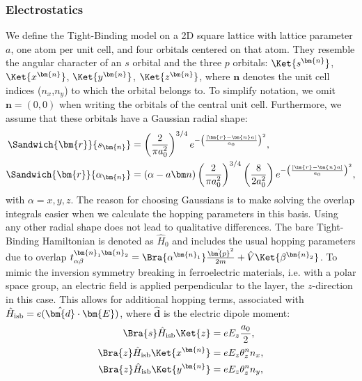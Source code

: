 \subsubsection{Electrostatics \label{sec:tb_model}}
We define the Tight-Binding model on a 2D square lattice with lattice parameter $a$, one atom per unit cell, and four orbitals centered on that atom.
They resemble the angular character of an $s$ orbital and the three $p$ orbitals: $\Ket{s^{\bm{n}}}$, $\Ket{x^{\bm{n}}}$, $\Ket{y^{\bm{n}}}$, $\Ket{z^{\bm{n}}}$, where $\bm{n}$ denotes the unit cell indices ($n_x$,$n_y$) to which the orbital belongs to.
To simplify notation, we omit $\bm{n} = (0, 0)$ when writing the orbitals of the central unit cell.
Furthermore, we assume that these orbitals have a Gaussian radial shape:
\begin{align}
	\Sandwich{\bm{r}}{s_{\bm{n}}} &= \left(\frac{2}{\pi a_0^2}\right)^{3/4}e^{-\left(\frac{|\bm{r}-\bm{n}a|}{a_0}\right)^2},\\
\Sandwich{\bm{r}}{\alpha_{\bm{n}}} &= (\alpha - a\bm n)\left(\frac{2}{\pi a_0^2}\right)^{3/4}\left(\frac{8}{2a_0^2}\right) e^{-\left(\frac{|\bm{r}-\bm{n}a|}{a_0}\right)^2},
\end{align}
with $\alpha = x, y, z$.
The reason for choosing Gaussians is to make solving the overlap integrals easier when we calculate the hopping parameters in this basis.
Using any other radial shape does not lead to qualitative differences.
The bare Tight-Binding Hamiltonian is denoted as $\hat{H}_0$ and includes the usual hopping parameters due to overlap $t_{\alpha\beta}^{\bm{n}_1\bm{n}_2} = \Bra{\alpha^{\bm{n}_1}}\frac{\hat{\bm{p}}^2}{2m} + \hat{V}\Ket{\beta^{\bm{n}_2}}$.
To mimic the inversion symmetry breaking in ferroelectric materials, i.e. with a polar space group, an electric field is applied perpendicular to the layer, the $z$-direction in this case.
This allows for additional hopping terms, associated with $\hat{H}_{\rm isb} = e (\hat{\bm{d}}\cdot \bm{E})$, where $\hat{\bm{d}}$ is the electric dipole moment:
\begin{align}
	\label{eq:dipole}
	\Bra{s} \hat{H}_{\rm isb} \Ket{z} &=  e E_z \frac{a_0}{2},\\
	\Bra{z} \hat{H}_{\rm isb} \Ket{x^{\bm{n}}} &= e E_z \theta_z^n n_x,\\
	\Bra{z} \hat{H}_{\rm isb} \Ket{y^{\bm{n}}} &= e E_z \theta_z^n n_y,
\end{align}
